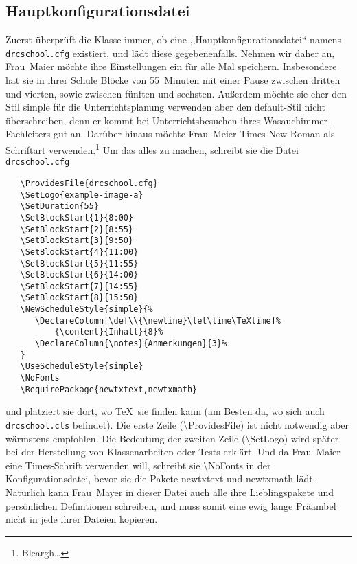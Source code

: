 \documentclass[hyperworksheet]{drcschool}
\newcommand*{\cs}[1]{\textup{\ttfamily\textbackslash#1}}                   %
\newcommand*{\pkg}[1]{\textup{\ttfamily#1}}                                %
\newcommand*{\opt}[1]{\textup{\ttfamily#1}}                                %
\begin{document}
\subsection{Hauptkonfigurationsdatei}

Zuerst überprüft die Klasse immer, ob eine ,,Hauptkonfigurationsdatei`` namens
\texttt{drcschool.cfg} existiert, und lädt diese gegebenenfalls.
Nehmen wir daher an, Frau~Maier möchte ihre Einstellungen ein für alle Mal speichern.
Insbesondere hat sie in ihrer Schule Blöcke von 55~Minuten mit einer Pause zwischen
dritten und vierten, sowie zwischen fünften und sechsten. Außerdem möchte sie
eher den Stil \opt{simple} für die Unterrichtsplanung verwenden aber den
\opt{default}-Stil nicht überschreiben, denn er kommt bei Unterrichtsbesuchen
ihres Wasauchimmer-Fachleiters gut an. Darüber hinaus möchte Frau~Meier
Times New Roman als Schriftart verwenden.\footnote{Bleargh\ldots}
Um das alles zu machen, schreibt sie die Datei \texttt{drcschool.cfg}
\begin{verbatim}
   \ProvidesFile{drcschool.cfg}
   \SetLogo{example-image-a}
   \SetDuration{55}
   \SetBlockStart{1}{8:00}
   \SetBlockStart{2}{8:55}
   \SetBlockStart{3}{9:50}
   \SetBlockStart{4}{11:00}
   \SetBlockStart{5}{11:55}
   \SetBlockStart{6}{14:00}
   \SetBlockStart{7}{14:55}
   \SetBlockStart{8}{15:50}
   \NewScheduleStyle{simple}{%
      \DeclareColumn[\def\\{\newline}\let\time\TeXtime]%
          {\content}{Inhalt}{8}%
      \DeclareColumn{\notes}{Anmerkungen}{3}%
   }
   \UseScheduleStyle{simple}
   \NoFonts
   \RequirePackage{newtxtext,newtxmath}
\end{verbatim}
und platziert sie dort, wo \TeX\ sie finden kann
(am Besten da, wo sich auch \texttt{drcschool.cls} befindet).
Die erste Zeile (\cs{ProvidesFile}) ist nicht notwendig aber wärmstens empfohlen.
Die Bedeutung der zweiten Zeile (\cs{SetLogo}) wird später bei der Herstellung
von Klassenarbeiten oder Tests erklärt. Und da Frau~Maier eine Times-Schrift
verwenden will, schreibt sie \cs{NoFonts} in der Konfigurationsdatei, bevor sie
die Pakete \pkg{newtxtext} und \pkg{newtxmath} lädt. Natürlich kann Frau~Mayer
in dieser Datei auch alle ihre Lieblingspakete und persönlichen Definitionen
schreiben, und muss somit eine ewig lange Präambel nicht in jede ihrer Dateien
kopieren.
\end{document}
